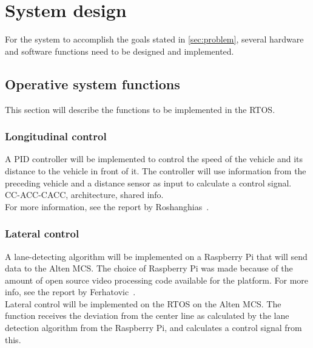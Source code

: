 \chapter{System design}
\label{sec:system_design}
For the system to accomplish the goals stated in \ref{sec:problem}, several hardware and software functions need to be designed and implemented.\\


\section{Operative system functions}
This section will describe the functions to be implemented in the RTOS.

\subsection{Longitudinal control}
A PID controller will be implemented to control the speed of the vehicle and its distance to the vehicle in front of it. The controller will use information from the preceding vehicle and a distance sensor as input to calculate a control signal. \\

CC-ACC-CACC, architecture, shared info.\\

For more information, see the report by Roshanghias~\cite{roshanghias2017}.

\subsection{Lateral control}
A lane-detecting algorithm will be implemented on a Raspberry Pi that will send data to the Alten MCS. The choice of Raspberry Pi was made because of the amount of open source video processing code available for the platform. For more info, see the report by Ferhatovic~\cite{ferhatovic2017}.\\

Lateral control will be implemented on the RTOS on the Alten MCS. The function receives the deviation from the center line as calculated by the lane detection algorithm from the Raspberry Pi, and calculates a control signal from this.

